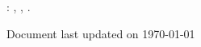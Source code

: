 \maketitle

\hfill
\vfill

{
	\setlength\parindent{0pt}

	\AuthorName{} \AuthorSurname{}: \textit{\Title{}}, \DegreeName{}, \textcopyright{} \CopyrightYear{}.
	\par\hfill{\scriptsize\color{gray}Document last updated on \today}
}
